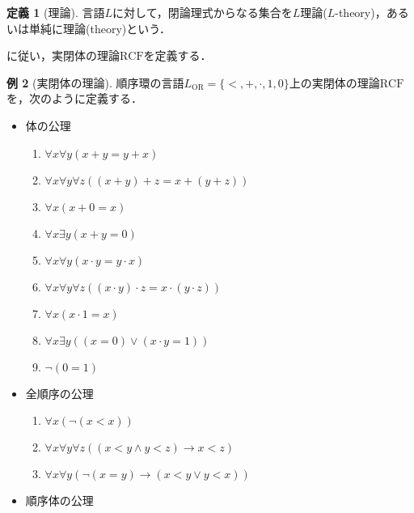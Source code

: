 \documentclass[uplatex, dvipdfmx]{jsarticle}
\numberwithin{equation}{section}
\newcommand{\RCF}{\mathrm{RCF}}
\theoremstyle{definition}
\newtheorem{definition}{定義}[section]
\newtheorem{example}[definition]{例}
\begin{document}
\begin{definition}[理論]
     言語$L$に対して，閉論理式からなる集合を$L$理論($L$-theory)，あるいは単純に理論(theory)という．
\end{definition}



\cite{Arai}に従い，実閉体の理論$\RCF$を定義する．

\begin{example}[実閉体の理論]
     順序環の言語$L_\mathrm{OR}=\{<, +, \cdot, 1, 0\}$上の実閉体の理論$\RCF$を，次のように定義する．
     
     \begin{itemize}
          \item 体の公理
          \begin{enumerate}
               \item $\forall x \forall y(x + y = y + x)$
               \item $\forall x \forall y \forall z((x + y) + z = x + (y + z))$
               \item $\forall x (x + 0 = x)$
               \item $\forall x \exists y (x + y = 0)$
               \item $\forall x \forall y(x \cdot y = y \cdot x)$
               \item $\forall x \forall y \forall z((x \cdot y) \cdot z = x \cdot (y \cdot z))$
               \item $\forall x (x \cdot 1 = x)$
               \item $\forall x \exists y ((x=0) \lor (x \cdot y = 1))$
               \item $\lnot(0 = 1)$
          \end{enumerate}
          \item 全順序の公理
          \begin{enumerate}
               \item $\forall x (\lnot(x<x))$
               \item $\forall x \forall y \forall z((x < y \land y < z) \rightarrow x < z)$
               \item $\forall x \forall y (\lnot(x = y) \rightarrow (x<y \lor y<x))$
          \end{enumerate}
          \item 順序体の公理
          \begin{enumerate}

\end{enumerate}
\end{itemize}
\end{example}
\end{document}
